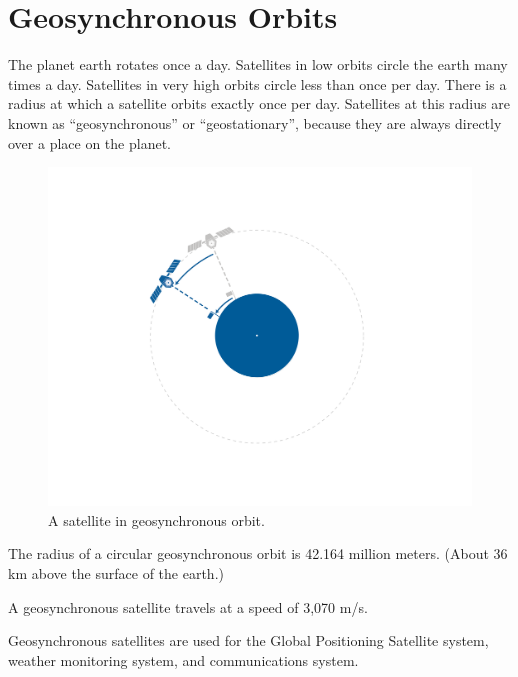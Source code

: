 \section{Geosynchronous Orbits}
The planet earth rotates once a day.  Satellites in low orbits circle
the earth many times a day. Satellites in very high orbits circle
less than once per day. There is a radius at which a satellite orbits
exactly once per day.  Satellites at this radius are known as
``geosynchronous'' or ``geostationary'', because they are always
directly over a place on the planet.
\begin{figure}[htbp]
    \centering
    \includegraphics[width=.75\textwidth]{geoSync.png}
    \caption{A satellite in geosynchronous orbit.}
    \label{fig:geoSync}
\end{figure}

The radius of a circular geosynchronous orbit is 42.164 million
meters. (About 36 km above the surface of the earth.)

A geosynchronous satellite travels at a speed of 3,070 m/s.

Geosynchronous satellites are used for the Global Positioning
Satellite system, weather monitoring system, and communications
system.
